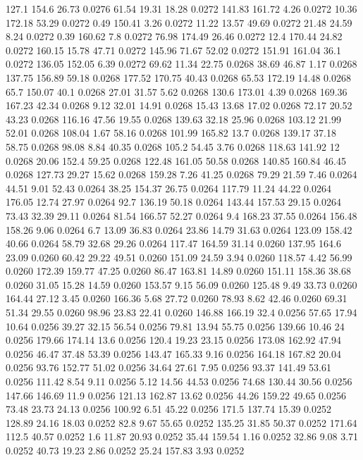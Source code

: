 127.1	154.6	26.73	0.0276
61.54	19.31	18.28	0.0272
141.83	161.72	4.26	0.0272
10.36	172.18	53.29	0.0272
0.49	150.41	3.26	0.0272
11.22	13.57	49.69	0.0272
21.48	24.59	8.24	0.0272
0.39	160.62	7.8	0.0272
76.98	174.49	26.46	0.0272
12.4	170.44	24.82	0.0272
160.15	15.78	47.71	0.0272
145.96	71.67	52.02	0.0272
151.91	161.04	36.1	0.0272
136.05	152.05	6.39	0.0272
69.62	11.34	22.75	0.0268
38.69	46.87	1.17	0.0268
137.75	156.89	59.18	0.0268
177.52	170.75	40.43	0.0268
65.53	172.19	14.48	0.0268
65.7	150.07	40.1	0.0268
27.01	31.57	5.62	0.0268
130.6	173.01	4.39	0.0268
169.36	167.23	42.34	0.0268
9.12	32.01	14.91	0.0268
15.43	13.68	17.02	0.0268
72.17	20.52	43.23	0.0268
116.16	47.56	19.55	0.0268
139.63	32.18	25.96	0.0268
103.12	21.99	52.01	0.0268
108.04	1.67	58.16	0.0268
101.99	165.82	13.7	0.0268
139.17	37.18	58.75	0.0268
98.08	8.84	40.35	0.0268
105.2	54.45	3.76	0.0268
118.63	141.92	12	0.0268
20.06	152.4	59.25	0.0268
122.48	161.05	50.58	0.0268
140.85	160.84	46.45	0.0268
127.73	29.27	15.62	0.0268
159.28	7.26	41.25	0.0268
79.29	21.59	7.46	0.0264
44.51	9.01	52.43	0.0264
38.25	154.37	26.75	0.0264
117.79	11.24	44.22	0.0264
176.05	12.74	27.97	0.0264
92.7	136.19	50.18	0.0264
143.44	157.53	29.15	0.0264
73.43	32.39	29.11	0.0264
81.54	166.57	52.27	0.0264
9.4	168.23	37.55	0.0264
156.48	158.26	9.06	0.0264
6.7	13.09	36.83	0.0264
23.86	14.79	31.63	0.0264
123.09	158.42	40.66	0.0264
58.79	32.68	29.26	0.0264
117.47	164.59	31.14	0.0260
137.95	164.6	23.09	0.0260
60.42	29.22	49.51	0.0260
151.09	24.59	3.94	0.0260
118.57	4.42	56.99	0.0260
172.39	159.77	47.25	0.0260
86.47	163.81	14.89	0.0260
151.11	158.36	38.68	0.0260
31.05	15.28	14.59	0.0260
153.57	9.15	56.09	0.0260
125.48	9.49	33.73	0.0260
164.44	27.12	3.45	0.0260
166.36	5.68	27.72	0.0260
78.93	8.62	42.46	0.0260
69.31	51.34	29.55	0.0260
98.96	23.83	22.41	0.0260
146.88	166.19	32.4	0.0256
57.65	17.94	10.64	0.0256
39.27	32.15	56.54	0.0256
79.81	13.94	55.75	0.0256
139.66	10.46	24	0.0256
179.66	174.14	13.6	0.0256
120.4	19.23	23.15	0.0256
173.08	162.92	47.94	0.0256
46.47	37.48	53.39	0.0256
143.47	165.33	9.16	0.0256
164.18	167.82	20.04	0.0256
93.76	152.77	51.02	0.0256
34.64	27.61	7.95	0.0256
93.37	141.49	53.61	0.0256
111.42	8.54	9.11	0.0256
5.12	14.56	44.53	0.0256
74.68	130.44	30.56	0.0256
147.66	146.69	11.9	0.0256
121.13	162.87	13.62	0.0256
44.26	159.22	49.65	0.0256
73.48	23.73	24.13	0.0256
100.92	6.51	45.22	0.0256
171.5	137.74	15.39	0.0252
128.89	24.16	18.03	0.0252
82.8	9.67	55.65	0.0252
135.25	31.85	50.37	0.0252
171.64	112.5	40.57	0.0252
1.6	11.87	20.93	0.0252
35.44	159.54	1.16	0.0252
32.86	9.08	3.71	0.0252
40.73	19.23	2.86	0.0252
25.24	157.83	3.93	0.0252
